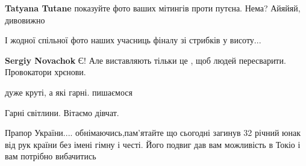\begin{itemize}
\begin{itemize}
\textbf{Tatyana Tutane} показуйте фото ваших мітингів проти путєна. Нема? Айяйяй, дивовижно

\end{itemize}

 
І жодної спільної фото наших учасниць фіналу зі стрибків у висоту...

\begin{itemize}
 
\textbf{Sergiy Novachok} Є! Але виставляють тільки це , щоб людей пересварити. Провокатори хрєнови.
\end{itemize}

 
дуже круті, а які гарні. пишаємося

 
Гарні світлини. Вітаємо дівчат.


 
Прапор України.... обнімаючись,пам'ятайте що сьогодні загинув 32 річний юнак від
рук країни без імені гімну і честі. Його подвиг дав вам можливість в Токіо і
вам потрібно вибачитись

 

\end{itemize}
